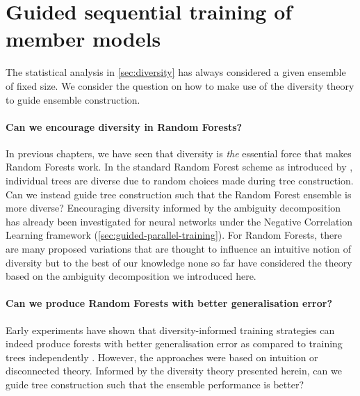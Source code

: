 \documentclass[
	twoside=false, %
]{kaobook}
\begin{document}
\section{Guided sequential training of member models}
\label{sec:dynamic-random-forests}

The statistical analysis in \cref{sec:diversity} has always considered a given ensemble of fixed size. 
We consider the question on how to make use of the diversity theory to guide ensemble construction.

\paragraph{Can we encourage diversity in Random Forests?} 
In previous chapters, we have seen that diversity is \textit{the} essential force that makes Random Forests work. In the standard Random Forest scheme as introduced by \citeauthor{breiman_RandomForests_2001}, individual trees are diverse due to random choices made during tree construction. Can we instead guide tree construction such that the Random Forest ensemble is more diverse?
Encouraging diversity informed by the ambiguity decomposition has already been investigated for neural networks under the Negative Correlation Learning framework (\cf \ref{sec:guided-parallel-training}). For Random Forests, there are many proposed variations that are thought to influence an intuitive notion of diversity 
\cite{ yang_DiversityBasedRandomForests_2019, gupta_GuidedRandomForest_2019, akhand_DecisionTreeEnsemble_2014, panhalkar_NovelApproachBuild_2022, adnan_EffectsDynamicSubspacing_2017, zouggar_SimplifyingRandomForests_2019}
but to the best of our knowledge none so far have considered the theory based on the ambiguity decomposition we introduced here.


\paragraph{Can we produce Random Forests with better generalisation error?}
Early experiments have shown that diversity-informed training strategies can indeed produce forests with better generalisation error as compared to training trees independently
\cite{bernard_DynamicRandomForests_2012,bernard_SelectionDecisionTrees_2009,buschjager_GeneralizedNegativeCorrelation_2020}. However, the approaches were based on intuition or disconnected theory. Informed by the diversity theory presented herein, can we guide tree construction such that the ensemble performance is better?
\end{document}
